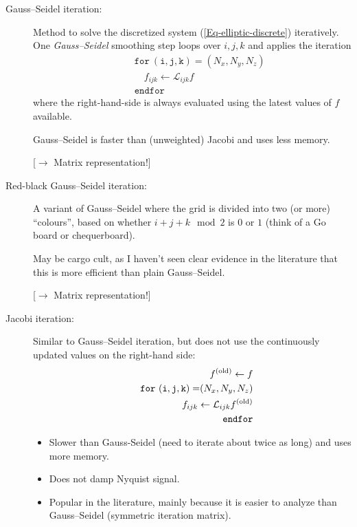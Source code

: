 \documentclass[\mydriver,12pt,twoside,notitlepage,letterpaper]{article}
\begin{document}
\begin{description}

\item[Gauss--Seidel iteration:]
  Method to solve the discretized system
  (\ref{Eq-elliptic-discrete}) iteratively.
  One \emph{Gauss--Seidel} smoothing step loops over $i,j,k$ and applies
  the iteration
  \begin{eqnarray}
    \label{Eq-Gauss-Seidel}
    && \mathtt{for\ (i,j,k)=}(N_x,N_y,N_z) \nonumber\\
    && \quad f_{ijk} \leftarrow \mathcal{L}_{ijk} f\\
    && \mathtt{endfor} \nonumber
  \end{eqnarray}
  where the right-hand-side is always evaluated using the latest values of
  $f$ available.

  Gauss--Seidel is faster than (unweighted) Jacobi and uses less memory.

  [$\rightarrow$ Matrix representation!]

\item[Red-black Gauss--Seidel iteration:]
  A variant of Gauss--Seidel where the grid is divided into two (or more)
  ``colours'', based on whether $i+j+k \mod 2$ is $0$ or $1$ (think of a
  Go board or chequerboard).

  May be cargo cult, as I haven't seen clear evidence in the literature
  that this is more efficient than plain Gauss--Seidel.

  [$\rightarrow$ Matrix representation!]

\item[Jacobi iteration:]
  Similar to Gauss--Seidel iteration, but does not use the continuously
  updated values on the right-hand side:
  \begin{eqnarray}
    \label{Eq-Jacobi}
    && f^{\rm(old)} \leftarrow f \nonumber\\
    && \mathtt{for\ (i,j,k)=}(N_x,N_y,N_z) \nonumber\\
    && \quad f_{ijk} \leftarrow \mathcal{L}_{ijk} f^{\rm(old)} \\
    && \mathtt{endfor} \nonumber\\
  \end{eqnarray}

\begin{itemize}
\item Slower than Gauss-Seidel (need to iterate about twice as long) and uses
  more memory.
\item Does not damp Nyquist signal.
\item Popular in the literature, mainly because it is easier to analyze
  than Gauss--Seidel (symmetric iteration matrix).
\end{itemize}


\end{description}
\end{document}
